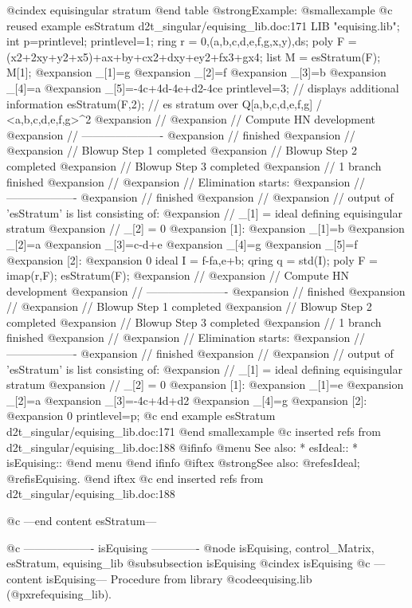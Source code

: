 @cindex equisingular stratum
@end table
@strong{Example:}
@smallexample
@c reused example esStratum d2t_singular/equising_lib.doc:171 
LIB "equising.lib";
int p=printlevel; 
printlevel=1;
ring r = 0,(a,b,c,d,e,f,g,x,y),ds;
poly F = (x2+2xy+y2+x5)+ax+by+cx2+dxy+ey2+fx3+gx4;
list M = esStratum(F);
M[1];
@expansion{} _[1]=g
@expansion{} _[2]=f
@expansion{} _[3]=b
@expansion{} _[4]=a
@expansion{} _[5]=-4c+4d-4e+d2-4ce
printlevel=3;    // displays additional information
esStratum(F,2);  // es stratum over Q[a,b,c,d,e,f,g] / <a,b,c,d,e,f,g>^2
@expansion{} // 
@expansion{} // Compute HN development
@expansion{} // ----------------------
@expansion{} // finished
@expansion{} // 
@expansion{} // Blowup Step 1 completed
@expansion{} // Blowup Step 2 completed
@expansion{} // Blowup Step 3 completed
@expansion{} // 1 branch finished
@expansion{} // 
@expansion{} // Elimination starts:
@expansion{} // -------------------
@expansion{} // finished
@expansion{} // 
@expansion{} // output of 'esStratum' is list consisting of:
@expansion{} //    _[1] = ideal defining equisingular stratum
@expansion{} //    _[2] = 0
@expansion{} [1]:
@expansion{}    _[1]=b
@expansion{}    _[2]=a
@expansion{}    _[3]=c-d+e
@expansion{}    _[4]=g
@expansion{}    _[5]=f
@expansion{} [2]:
@expansion{}    0
ideal I = f-fa,e+b;
qring q = std(I);
poly F = imap(r,F);
esStratum(F);
@expansion{} // 
@expansion{} // Compute HN development
@expansion{} // ----------------------
@expansion{} // finished
@expansion{} // 
@expansion{} // Blowup Step 1 completed
@expansion{} // Blowup Step 2 completed
@expansion{} // Blowup Step 3 completed
@expansion{} // 1 branch finished
@expansion{} // 
@expansion{} // Elimination starts:
@expansion{} // -------------------
@expansion{} // finished
@expansion{} // 
@expansion{} // output of 'esStratum' is list consisting of:
@expansion{} //    _[1] = ideal defining equisingular stratum
@expansion{} //    _[2] = 0
@expansion{} [1]:
@expansion{}    _[1]=e
@expansion{}    _[2]=a
@expansion{}    _[3]=-4c+4d+d2
@expansion{}    _[4]=g
@expansion{} [2]:
@expansion{}    0
printlevel=p;
@c end example esStratum d2t_singular/equising_lib.doc:171
@end smallexample
@c inserted refs from d2t_singular/equising_lib.doc:188
@ifinfo
@menu
See also:
* esIdeal::
* isEquising::
@end menu
@end ifinfo
@iftex
@strong{See also:}
@ref{esIdeal};
@ref{isEquising}.
@end iftex
@c end inserted refs from d2t_singular/equising_lib.doc:188

@c ---end content esStratum---

@c ------------------- isEquising -------------
@node isEquising, control_Matrix, esStratum, equising_lib
@subsubsection isEquising
@cindex isEquising
@c ---content isEquising---
Procedure from library @code{equising.lib} (@pxref{equising_lib}).

